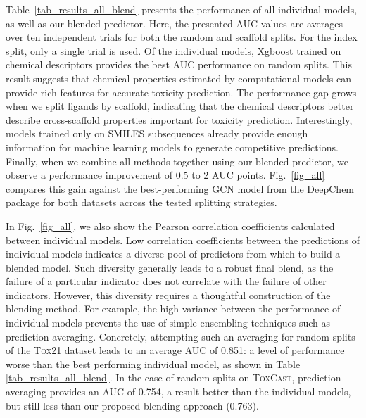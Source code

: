 \documentclass[11pt,a4paper]{article}
\begin{document}
Table~\ref{tab_results_all_blend} presents the performance of all individual models, as
well as our blended predictor. Here, the presented AUC values are averages over ten
independent trials for both the random and scaffold splits. For the index split, only
a single trial is used. 
Of the individual models, Xgboost trained on chemical descriptors provides the best 
AUC performance on random splits.
This result suggests that chemical properties estimated by computational models
can provide rich features for accurate toxicity prediction.
The performance gap grows when we split ligands by scaffold, indicating that the
chemical descriptors better describe cross-scaffold properties important for toxicity
prediction. Interestingly, models trained only on SMILES subsequences already provide 
enough information for machine learning models to generate competitive predictions. 
Finally, when we combine all methods together using our blended predictor, 
we observe a performance improvement of  0.5 to 2 AUC points.  Fig.~\ref{fig_all} 
compares this gain against the best-performing GCN model 
from the DeepChem package \cite{Wu:2017} for both datasets across the 
tested splitting strategies.

In Fig.~\ref{fig_all}, we also show the Pearson correlation coefficients 
calculated between individual models. 
Low correlation coefficients between the predictions of individual models 
indicates a diverse pool of predictors from which to build a blended model. Such
diversity generally leads to a robust final blend, as the failure of a 
particular indicator does not correlate with the failure of other indicators.
However, this diversity requires a thoughtful construction of the blending 
method. For example, the high variance between the performance of individual models
prevents the use of simple ensembling techniques such as prediction averaging.
Concretely, attempting such an averaging for random splits of the \textsc{Tox21}
dataset leads to an average AUC of 0.851: a level of performance worse than the
best performing individual model, as shown in Table \ref{tab_results_all_blend}.
In the case of random splits on \textsc{ToxCast},
prediction averaging provides an AUC of 0.754, a result better than the individual
models, but still less than our proposed blending approach (0.763).    
\end{document}
